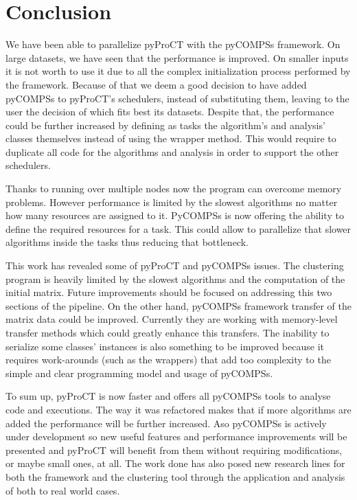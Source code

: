 \chapter{Conclusion}


We have been able to parallelize pyProCT with the pyCOMPSs framework. On large datasets, we have seen that the performance is improved. On smaller inputs it is not worth to use it due to all the complex initialization process performed by the framework. Because of that we deem a good decision to have added pyCOMPSs to pyProCT's schedulers, instead of substituting them, leaving to the user the decision of which fits best its datasets. Despite that, the performance could be further increased by defining as tasks the algorithm's and analysis' classes themselves instead of using the wrapper method. This would require to duplicate all code for the algorithms and analysis in order to support the other schedulers.

Thanks to running over multiple nodes now the program can overcome memory problems. However performance is limited by the slowest algorithms no matter how many resources are assigned to it. PyCOMPSs is now offering the ability to define the required resources for a task. This could allow to parallelize that slower algorithms inside the tasks thus reducing that bottleneck. 

This work has revealed some of pyProCT and pyCOMPSs issues. The clustering program is heavily limited by the slowest algorithms and the computation of the initial matrix. Future improvements should be focused on addressing this two sections of the pipeline. On the other hand, pyCOMPSs framework transfer of the matrix data could be improved. Currently they are working with memory-level transfer methods which could greatly enhance this transfers. The inability to serialize some classes' instances is also something to be improved because it requires work-arounds (such as the wrappers) that add too complexity to the simple and clear programming model and usage of pyCOMPSs.

To sum up, pyProCT is now faster and offers all pyCOMPSs tools to analyse code and executions. The way it was refactored makes that if more algorithms are added the performance will be further increased. Aso pyCOMPSs is actively under development so new useful features and performance improvements will be presented and pyProCT will benefit from them without requiring modifications, or maybe small ones, at all. The work done has also posed new research lines for both the framework and the clustering tool through the application and analysis of both to real world cases.



